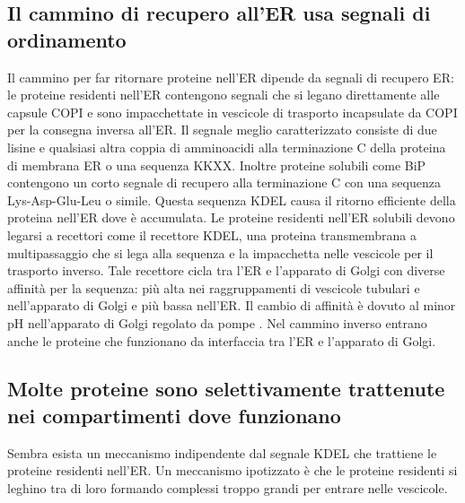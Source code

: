 \subsection{Il cammino di recupero all'ER usa segnali di ordinamento}
Il cammino per far ritornare proteine nell'ER dipende da segnali di recupero ER: le proteine residenti nell'ER contengono segnali che si legano direttamente alle capsule COPI e sono
impacchettate in vescicole di trasporto incapsulate da COPI per la consegna inversa all'ER. Il segnale meglio caratterizzato consiste di due lisine e qualsiasi altra coppia di 
amminoacidi alla terminazione C della proteina di membrana ER o una sequenza KKXX. Inoltre proteine solubili come BiP contengono un corto segnale di recupero alla terminazione C
con una sequenza Lys-Asp-Glu-Leu o simile. Questa sequenza KDEL causa il ritorno efficiente della proteina nell'ER dove \`e accumulata. Le proteine residenti nell'ER solubili devono 
legarsi a recettori come il recettore KDEL, una proteina transmembrana a multipassaggio che si lega alla sequenza e la impacchetta nelle vescicole per il trasporto inverso. Tale 
recettore cicla tra l'ER e l'apparato di Golgi con diverse affinit\`a per la sequenza: pi\`u alta nei raggruppamenti di vescicole tubulari e nell'apparato di Golgi e pi\`u bassa
nell'ER. Il cambio di affinit\`a \`e dovuto al minor pH nell'apparato di Golgi regolato da pompe . Nel cammino inverso entrano anche le proteine che funzionano da interfaccia
tra l'ER e l'apparato di Golgi.
\subsection{Molte proteine sono selettivamente trattenute nei compartimenti dove funzionano}
Sembra esista un meccanismo indipendente dal segnale KDEL che trattiene le proteine residenti nell'ER. Un meccanismo ipotizzato \`e che le proteine residenti si leghino tra di loro 
formando complessi troppo grandi per entrare nelle vescicole. 
